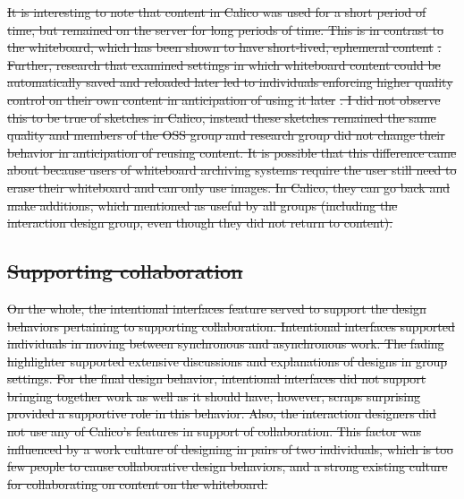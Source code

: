 \documentclass[12pt,fleqn]{ucithesis}
\providecommand{\DIFdeltex}[1]{{\protect\color{red}\sout{#1}}}                      %
\providecommand{\DIFdel}[1]{\texorpdfstring{\DIFdeltex{#1}}{}} %
\begin{document}
\DIFdel{It is interesting to note that content in Calico was used for a short period of time, but remained on the server for long periods of time. This is in contrast to the whiteboard, which has been shown to have short-lived, ephemeral content }%
\DIFdel{. Further, research that examined settings in which whiteboard content could be automatically saved and reloaded later led to individuals enforcing higher quality control on their own content in anticipation of using it later }%
\DIFdel{. I did not observe this to be true of sketches in Calico, instead these sketches remained the same quality and members of the OSS group and research group did not change their behavior in anticipation of reusing content. It is possible that this difference came about because users of whiteboard archiving systems require the user still need to erase their whiteboard and can only use images. In Calico, they can go back and make additions, which mentioned as useful by all groups (including the interaction design group, even though they did not return to content).
}%



\subsection{\DIFdel{Supporting collaboration}}
\addtocounter{subsection}{-1}%

\DIFdel{On the whole, the intentional interfaces feature served to support the design behaviors pertaining to supporting collaboration. Intentional interfaces supported individuals in moving between synchronous and asynchronous work. The fading highlighter supported extensive discussions and explanations of designs in group settings. For the final design behavior, intentional interfaces did not support bringing together work as well as it should have, however, scraps surprising provided a supportive role in this behavior. Also, the interaction designers did not use any of Calico's features in support of collaboration. This factor was influenced by a work culture of designing in pairs of two individuals, which is too few people to cause collaborative design behaviors, and a strong existing culture for collaborating on content on the whiteboard.
}%
\end{document}
